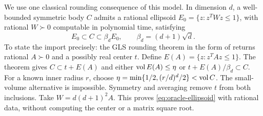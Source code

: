 We use one classical rounding consequence of this model. In dimension
$d$, a well-bounded symmetric body $C$ admits a rational ellipsoid
$E_0=\{z:z^TWz\le1\}$, with rational $W\succ0$ computable in polynomial
time, satisfying
\begin{equation}\label{eq:oracle-ellipsoid}
 E_0\subset C\subset\beta_dE_0,\qquad
 \beta_d=(d+1)\sqrt d.
\end{equation}
To state the import precisely: the GLS rounding theorem in the form of
\citet[Theorem B.5]{dpv2011} returns rational $A\succ0$ and a possibly
real center $t$. Define
$E(A)=\{z:z^TAz\le1\}$. The theorem gives
$C\subset t+E(A)$ and either $\operatorname{vol} E(A)\le\eta$ or
$t+E(A)/\beta_d\subset C$. For a known inner radius $r$, choose
$\eta=\min\{1/2,(r/d)^d/2\}<\operatorname{vol} C$. The small-volume alternative is
impossible. Symmetry and averaging remove $t$ from both inclusions.
Take $W=d(d+1)^2A$. This proves \eqref{eq:oracle-ellipsoid} with rational
data, without computing the center or a matrix square root.

